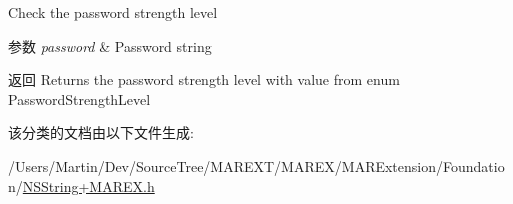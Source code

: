 Check the password strength level


\begin{DoxyParams}{参数}
{\em password} & Password string\\
\hline
\end{DoxyParams}
\begin{DoxyReturn}{返回}
Returns the password strength level with value from enum Password\+Strength\+Level 
\end{DoxyReturn}


该分类的文档由以下文件生成\+:\begin{DoxyCompactItemize}
\item 
/\+Users/\+Martin/\+Dev/\+Source\+Tree/\+M\+A\+R\+E\+X\+T/\+M\+A\+R\+E\+X/\+M\+A\+R\+Extension/\+Foundation/\hyperlink{_n_s_string_09_m_a_r_e_x_8h}{N\+S\+String+\+M\+A\+R\+E\+X.\+h}\end{DoxyCompactItemize}

